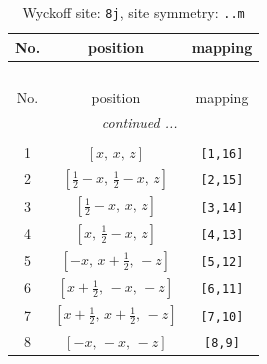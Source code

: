 \documentclass[fleqn,8pt]{jsarticle}
\begin{document}
\begin{longtable}{ccc}
\caption{Wyckoff site: {\tt 8j}, site symmetry: {\tt ..m}}
 \\
 \hline \hline
No. & position & mapping \\ \hline \endfirsthead

\multicolumn{2}{l}{\tablename\ \thetable{}} \\
 \hline \hline
No. & position & mapping \\ \hline \endhead

 \hline \hline
\multicolumn{2}{r}{\footnotesize\it continued ...} \\ \endfoot

 \hline \hline
\multicolumn{2}{r}{} \\ \endlastfoot

1 & $\left[ x,\, x,\, z \right]$ & {\tt [1,16]} \\ \hline
2 & $\left[ \frac{1}{2} - x,\, \frac{1}{2} - x,\, z \right]$ & {\tt [2,15]} \\ \hline
3 & $\left[ \frac{1}{2} - x,\, x,\, z \right]$ & {\tt [3,14]} \\ \hline
4 & $\left[ x,\, \frac{1}{2} - x,\, z \right]$ & {\tt [4,13]} \\ \hline
5 & $\left[ - x,\, x + \frac{1}{2},\, - z \right]$ & {\tt [5,12]} \\ \hline
6 & $\left[ x + \frac{1}{2},\, - x,\, - z \right]$ & {\tt [6,11]} \\ \hline
7 & $\left[ x + \frac{1}{2},\, x + \frac{1}{2},\, - z \right]$ & {\tt [7,10]} \\ \hline
8 & $\left[ - x,\, - x,\, - z \right]$ & {\tt [8,9]} \\
\end{longtable}
\renewcommand{\arraystretch}{1.2}
\end{document}
